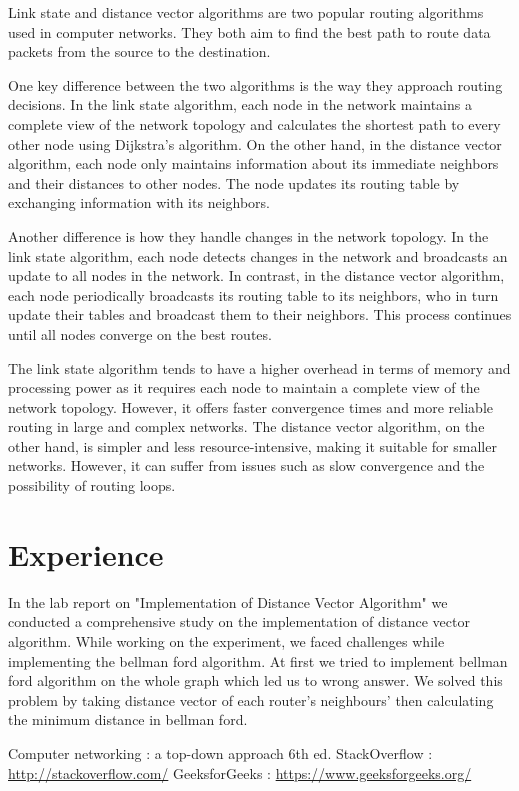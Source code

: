 \documentclass[11pt]{article}
\begin{document}
Link state and distance vector algorithms are two popular routing algorithms used in computer networks. They both aim to find the best path to route data packets from the source to the destination.

One key difference between the two algorithms is the way they approach routing decisions. In the link state algorithm, each node in the network maintains a complete view of the network topology and calculates the shortest path to every other node using Dijkstra's algorithm. On the other hand, in the distance vector algorithm, each node only maintains information about its immediate neighbors and their distances to other nodes. The node updates its routing table by exchanging information with its neighbors.

Another difference is how they handle changes in the network topology. In the link state algorithm, each node detects changes in the network and broadcasts an update to all nodes in the network. In contrast, in the distance vector algorithm, each node periodically broadcasts its routing table to its neighbors, who in turn update their tables and broadcast them to their neighbors. This process continues until all nodes converge on the best routes.

The link state algorithm tends to have a higher overhead in terms of memory and processing power as it requires each node to maintain a complete view of the network topology. However, it offers faster convergence times and more reliable routing in large and complex networks. The distance vector algorithm, on the other hand, is simpler and less resource-intensive, making it suitable for smaller networks. However, it can suffer from issues such as slow convergence and the possibility of routing loops.


\section{Experience}
In the lab report on "Implementation of Distance Vector Algorithm" we conducted a comprehensive study on the implementation of distance vector algorithm. While working on the experiment, we faced challenges while implementing the bellman ford algorithm. At first we tried to implement bellman ford algorithm on the whole graph which led us to wrong answer. We solved this problem by taking distance vector of each router's neighbours' then calculating the minimum distance in bellman ford. 



\begin{thebibliography}{1}
  Computer networking : a top-down approach 6th ed.
 StackOverflow : \url{http://stackoverflow.com/}
 GeeksforGeeks : \url{https://www.geeksforgeeks.org/}
\end{thebibliography}
\end{document}

